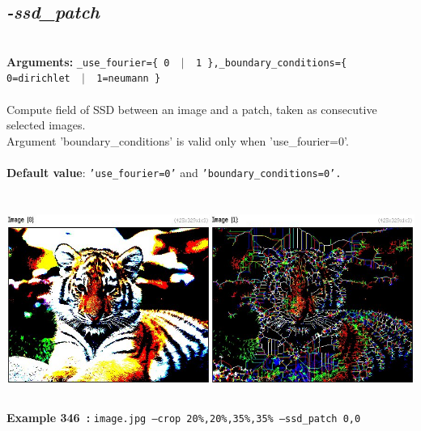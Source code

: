 \documentclass[a4paper,11pt,twoside]{book}
\begin{document}
\subsection{\emph{-ssd\_patch} }\vspace*{-0.5em}
~\\\textbf{Arguments: } 
{\small \texttt{\_use\_fourier=\{ 0 ~$|$~ 1 \},\_boundary\_conditions=\{ 0=dirichlet ~$|$~ 1=neumann \}}}\\~\\
Compute field of SSD between an image and a patch, taken as consecutive selected images.
~\\Argument 'boundary\_conditions' is valid only when 'use\_fourier=0'.
~\\~\\\textbf{Default value}: {\small \texttt{'use\_fourier=0'} and \texttt{'boundary\_conditions=0'.}}
\begin{center}\includegraphics[keepaspectratio=true,height=7cm,width=\textwidth]{img/gmic_def346.jpg}\\
{\footnotesize \textbf{Example 346~:} \texttt{image.jpg --crop 20\%,20\%,35\%,35\% --ssd\_patch 0,0}}
\end{center}
\end{document}
